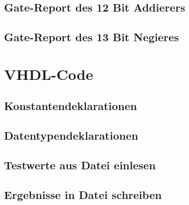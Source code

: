  \section{Gate-Report des 12 Bit Addierers}
 
 \section{Gate-Report des 13 Bit Negieres}
 
 
 
 \chapter{VHDL-Code}
 \section{Konstantendeklarationen}
 
 \section{Datentypendeklarationen}
 
 \section{Testwerte aus Datei einlesen}
 
 
 \section{Ergebnisse in Datei schreiben}
 
 
